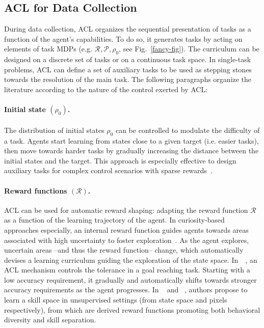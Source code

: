 \documentclass{article}
\newcommand{\mycite}[1]{\citeauthor{#1}~\shortcite{#1}}
\begin{document}
\subsection{ACL for Data Collection}
\label{sec:lever_data_collection}



During data collection, ACL organizes the sequential presentation of tasks as a function of the agent's capabilities. To do so, it generates tasks by acting on elements of task MDPs (e.g. $\mathcal{R}, \mathcal{P}, \rho_0$, see Fig.~\ref{fancy-fig}). The curriculum can be designed on a discrete set of tasks or on a continuous task space. In single-task problems, ACL can define a set of auxiliary tasks to be used as stepping stones towards the resolution of the main task. The following paragraphs organize the literature according to the nature of the control exerted by ACL:

\paragraph{Initial state $(\rho_0)$.}The distribution of initial states $\rho_0$ can be controlled to modulate the difficulty of a task. Agents start learning from states close to a given target (i.e. easier tasks), then move towards harder tasks by gradually increasing the distance between the initial states and the target. This approach is especially effective to design auxiliary tasks for complex control scenarios with sparse rewards~\cite{reverse-cur,BaRC,montezuma-single-demo}.

\paragraph{Reward functions $(\mathcal{R})$.}ACL can be used for automatic reward shaping: adapting the reward function $\mathcal{R}$ as a function of the learning trajectory of the agent. In curiosity-based approaches especially, an internal reward function guides agents towards areas associated with high uncertainty to foster exploration~\cite{countbased,icm,disagreement,pathakdisagreement,rnd}. As the agent explores, uncertain areas --and thus the reward function-- change, which automatically devises a learning curriculum guiding the exploration of the state space. In~\mycite{fournier-accuracy-acl}, an ACL mechanism controls the tolerance in a goal reaching task. Starting with a low accuracy requirement, it gradually and automatically shifts towards stronger accuracy requirements as the agent progresses. In \mycite{diayn} and \mycite{metarl-carml}, authors propose to learn a skill space in unsupervised settings (from state space and pixels respectively), from which are derived reward functions promoting both behavioral diversity and skill separation. 
\end{document}
